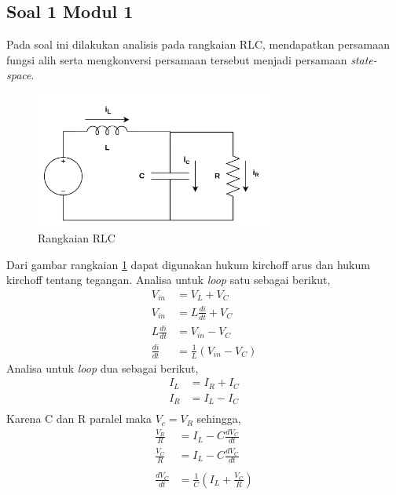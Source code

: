 \documentclass[../cover.tex]{subfiles}
\begin{document}
    \subsection{Soal 1 Modul 1}
    Pada soal ini dilakukan analisis pada rangkaian RLC, mendapatkan persamaan fungsi alih serta mengkonversi persamaan tersebut menjadi persamaan \textit{state-space}.
    \begin{figure}[H]
        \centering
        \includegraphics[width = 0.7\textwidth]{assets/image/rangkaianRLC.png}
        \caption{Rangkaian RLC}
        \label{gambar_6}
    \end{figure}
    Dari gambar rangkaian \ref{gambar_6} dapat digunakan hukum kirchoff arus dan hukum kirchoff tentang tegangan. Analisa untuk \textit{loop} satu sebagai berikut,
    \begin{equation}
        \begin{split}
                    V_{in} &= V_L + V_C \\[5pt]
                    V_{in} &= L\frac{di}{dt}+V_C \\[5pt]
            L\frac{di}{dt} &= V_{in} - V_C \\[5pt]
             \frac{di}{dt} &= \frac{1}{L} (V_{in} - V_C)
            \label{persamaan_23}
        \end{split}
    \end{equation}
    Analisa untuk \textit{loop} dua sebagai berikut,
    \begin{equation}
        \begin{split}
            I_L &= I_R + I_C \\[5pt]     
            I_R &= I_L - I_C \\[5pt]
        \end{split}
    \end{equation}
    Karena C dan R paralel maka $V_c = V_R$ sehingga,
    \begin{equation}
        \begin{split}
            \frac{V_R}{R} &= I_L - C\frac{dV_C}{dt} \\[5pt]
            \frac{V_C}{R} &= I_L - C\frac{dV_C}{dt} \\[5pt] \\[5pt]
            \frac{dV_C}{dt} &= \frac{1}{C} \left( I_L + \frac{V_C}{R} \right)
        \end{split}
    \end{equation}
\end{document}
